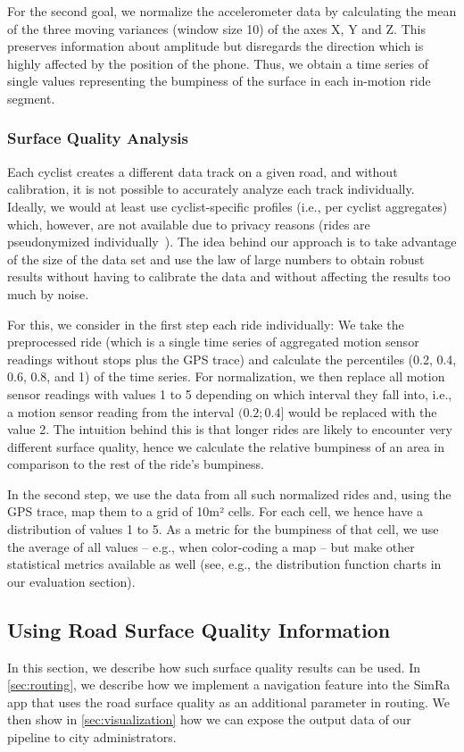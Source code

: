 For the second goal, we normalize the accelerometer data by calculating the mean of the three moving variances (window size 10) of the axes X, Y and Z.
This preserves information about amplitude but disregards the direction which is highly affected by the position of the phone.
Thus, we obtain a time series of single values representing the bumpiness of the surface in each in-motion ride segment.

\subsubsection{Surface Quality Analysis}
\label{subsubsec:surface_quality_analysis}
Each cyclist creates a different data track on a given road, and without calibration, it is not possible to accurately analyze each track individually.
Ideally, we would at least use cyclist-specific profiles (i.e., per cyclist aggregates) which, however, are not available due to privacy reasons (rides are pseudonymized individually~\cite{karakaya2020simra}).
The idea behind our approach is to take advantage of the size of the data set and use the law of large numbers to obtain robust results without having to calibrate the data and without affecting the results too much by noise.

For this, we consider in the first step each ride individually:
We take the preprocessed ride (which is a single time series of aggregated motion sensor readings without stops plus the GPS trace) and calculate the percentiles (0.2, 0.4, 0.6, 0.8, and 1) of the time series.
For normalization, we then replace all motion sensor readings with values 1 to 5 depending on which interval they fall into, i.e., a motion sensor reading from the interval $(0.2;0.4]$ would be replaced with the value 2.
The intuition behind this is that longer rides are likely to encounter very different surface quality, hence we calculate the relative bumpiness of an area in comparison to the rest of the ride's bumpiness.

In the second step, we use the data from all such normalized rides and, using the GPS trace, map them to a grid of 10m² cells.
For each cell, we hence have a distribution of values 1 to 5.
As a metric for the bumpiness of that cell, we use the average of all values -- e.g., when color-coding a map -- but make other statistical metrics available as well (see, e.g., the distribution function charts in our evaluation section).

\subsection{Using Road Surface Quality Information}
\label{subsec:using_road_surface_quality_information}
In this section, we describe how such surface quality results can be used.
In \cref{sec:routing}, we describe how we implement a navigation feature into the SimRa app that uses the road surface quality as an additional parameter in routing.
We then show in \cref{sec:visualization} how we can expose the output data of our pipeline to city administrators.


